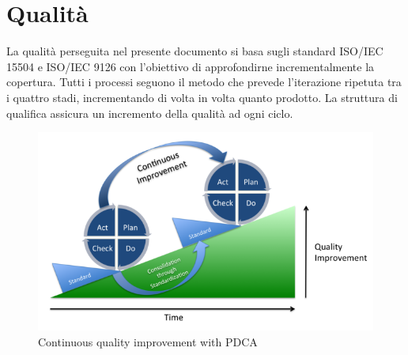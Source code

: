\pagebreak
\section{Qualità}
\label{appendice-qualita}
La qualità perseguita nel presente documento si basa sugli standard ISO/IEC 15504  e ISO/IEC 9126 con l'obiettivo di approfondirne incrementalmente la copertura. Tutti i processi seguono il metodo  che prevede l'iterazione ripetuta tra i quattro stadi, incrementando di volta in volta quanto prodotto. La struttura di qualifica assicura un incremento della qualità ad ogni ciclo. \\
	\begin{figure}[h]
	\centering \includegraphics[width=1\textwidth]{PDCA.png}
	\caption{Continuous quality improvement with PDCA}
	\end{figure}
	
